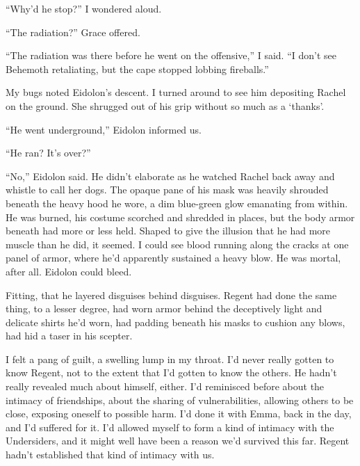 ``Why'd he stop?'' I wondered aloud.



``The radiation?''  Grace offered.



``The radiation was there before he went on the offensive,'' I said.  ``I don't see Behemoth retaliating, but the cape stopped lobbing fireballs.''



My bugs noted Eidolon's descent.  I turned around to see him depositing Rachel on the ground.  She shrugged out of his grip without so much as a `thanks'.



``He went underground,'' Eidolon informed us.



``He ran?  It's over?''



``No,'' Eidolon said.  He didn't elaborate as he watched Rachel back away and whistle to call her dogs.  The opaque pane of his mask was heavily shrouded beneath the heavy hood he wore, a dim blue-green glow emanating from within.  He was burned, his costume scorched and shredded in places, but the body armor beneath had more or less held.  Shaped to give the illusion that he had more muscle than he did, it seemed.  I could see blood running along the cracks at one panel of armor, where he'd apparently sustained a heavy blow.  He was mortal, after all.  Eidolon could bleed.



Fitting, that he layered disguises behind disguises.  Regent had done the same thing, to a lesser degree, had worn armor behind the deceptively light and delicate shirts he'd worn, had padding beneath his masks to cushion any blows, had hid a taser in his scepter.



I felt a pang of guilt, a swelling lump in my throat.  I'd never really gotten to know Regent, not to the extent that I'd gotten to know the others.  He hadn't really revealed much about himself, either.  I'd reminisced before about the intimacy of friendships, about the sharing of vulnerabilities, allowing others to be close, exposing oneself to possible harm.  I'd done it with Emma, back in the day, and I'd suffered for it.  I'd allowed myself to form a kind of intimacy with the Undersiders, and it might well have been a reason we'd survived this far.  Regent hadn't established that kind of intimacy with us.



